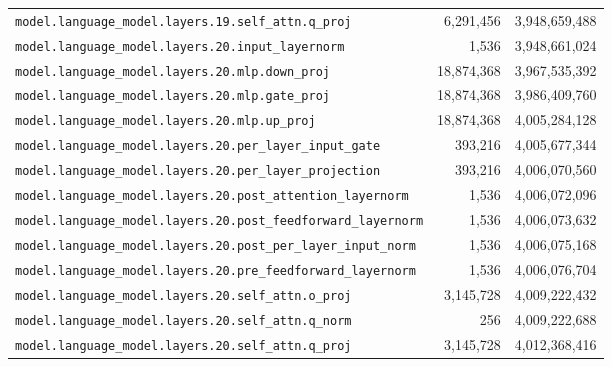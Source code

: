 \documentclass[10pt,a4paper]{article}
\theoremstyle{definition}
\begin{document}
\begin{appendices}
\begin{longtable}{p{9.5cm}rr}
\texttt{model.\allowbreak{}language\_model.\allowbreak{}layers.\allowbreak{}19.\allowbreak{}self\_attn.\allowbreak{}q\_proj} & 6,291,456 & 3,948,659,488 \\
\texttt{model.\allowbreak{}language\_model.\allowbreak{}layers.\allowbreak{}20.\allowbreak{}input\_layernorm} & 1,536 & 3,948,661,024 \\
\texttt{model.\allowbreak{}language\_model.\allowbreak{}layers.\allowbreak{}20.\allowbreak{}mlp.\allowbreak{}down\_proj} & 18,874,368 & 3,967,535,392 \\
\texttt{model.\allowbreak{}language\_model.\allowbreak{}layers.\allowbreak{}20.\allowbreak{}mlp.\allowbreak{}gate\_proj} & 18,874,368 & 3,986,409,760 \\
\texttt{model.\allowbreak{}language\_model.\allowbreak{}layers.\allowbreak{}20.\allowbreak{}mlp.\allowbreak{}up\_proj} & 18,874,368 & 4,005,284,128 \\
\texttt{model.\allowbreak{}language\_model.\allowbreak{}layers.\allowbreak{}20.\allowbreak{}per\_layer\_input\_gate} & 393,216 & 4,005,677,344 \\
\texttt{model.\allowbreak{}language\_model.\allowbreak{}layers.\allowbreak{}20.\allowbreak{}per\_layer\_projection} & 393,216 & 4,006,070,560 \\
\texttt{model.\allowbreak{}language\_model.\allowbreak{}layers.\allowbreak{}20.\allowbreak{}post\_attention\_layernorm} & 1,536 & 4,006,072,096 \\
\texttt{model.\allowbreak{}language\_model.\allowbreak{}layers.\allowbreak{}20.\allowbreak{}post\_feedforward\_layernorm} & 1,536 & 4,006,073,632 \\
\texttt{model.\allowbreak{}language\_model.\allowbreak{}layers.\allowbreak{}20.\allowbreak{}post\_per\_layer\_input\_norm} & 1,536 & 4,006,075,168 \\
\texttt{model.\allowbreak{}language\_model.\allowbreak{}layers.\allowbreak{}20.\allowbreak{}pre\_feedforward\_layernorm} & 1,536 & 4,006,076,704 \\
\texttt{model.\allowbreak{}language\_model.\allowbreak{}layers.\allowbreak{}20.\allowbreak{}self\_attn.\allowbreak{}o\_proj} & 3,145,728 & 4,009,222,432 \\
\texttt{model.\allowbreak{}language\_model.\allowbreak{}layers.\allowbreak{}20.\allowbreak{}self\_attn.\allowbreak{}q\_norm} & 256 & 4,009,222,688 \\
\texttt{model.\allowbreak{}language\_model.\allowbreak{}layers.\allowbreak{}20.\allowbreak{}self\_attn.\allowbreak{}q\_proj} & 3,145,728 & 4,012,368,416 \\

\end{longtable}
\end{appendices}
\end{document}
